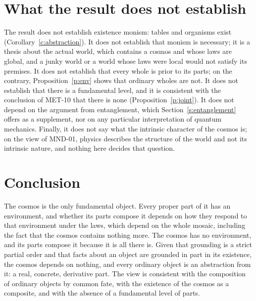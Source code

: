 \documentclass{situationist-preprint}
\begin{document}
\section{What the result does not establish}\label{s:limits}

The result does not establish existence monism: tables and organisms exist (Corollary~\ref{c:abstraction}). It does not establish that monism is necessary; it is a thesis about the actual world, which contains a cosmos and whose laws are global, and a junky world or a world whose laws were local would not satisfy its premises. It does not establish that every whole is prior to its parts; on the contrary, Proposition~\ref{p:env} shows that ordinary wholes are not. It does not establish that there is a fundamental level, and it is consistent with the conclusion of MET-10 that there is none (Proposition~\ref{p:joint}). It does not depend on the argument from entanglement, which Section~\ref{s:entanglement} offers as a supplement, nor on any particular interpretation of quantum mechanics. Finally, it does not say what the intrinsic character of the cosmos is; on the view of MND-01, physics describes the structure of the world and not its intrinsic nature, and nothing here decides that question.

\section{Conclusion}

The cosmos is the only fundamental object. Every proper part of it has an environment, and whether its parts compose it depends on how they respond to that environment under the laws, which depend on the whole mosaic, including the fact that the cosmos contains nothing more. The cosmos has no environment, and its parts compose it because it is all there is. Given that grounding is a strict partial order and that facts about an object are grounded in part in its existence, the cosmos depends on nothing, and every ordinary object is an abstraction from it: a real, concrete, derivative part. The view is consistent with the composition of ordinary objects by common fate, with the existence of the cosmos as a composite, and with the absence of a fundamental level of parts.
\end{document}
